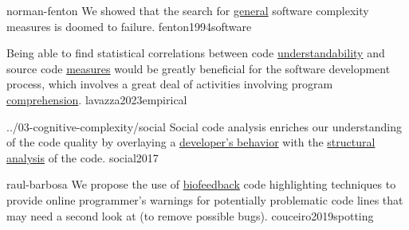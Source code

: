 \documentclass{article}
\begin{document}

\lnQuote
  {norman-fenton}
  {We showed that the search for \ul{general} software complexity measures is doomed to failure.}
  {fenton1994software}

  {Being able to find statistical correlations between code \ul{understandability} and source code \ul{measures} would be greatly beneficial for the software development process, which involves a great deal of activities involving program \ul{comprehension}.}
  {lavazza2023empirical}


\lnQuote
  {../03-cognitive-complexity/social}
  {Social code analysis enriches our understanding of the code quality by overlaying a \ul{developer's behavior} with the \ul{structural analysis} of the code.}
  {social2017}


\lnQuote
  {raul-barbosa}
  {We propose the use of \ul{biofeedback} code highlighting techniques to provide online programmer's warnings for potentially problematic code lines that may need a second look at (to remove possible bugs).}
  {couceiro2019spotting}
\end{document}

